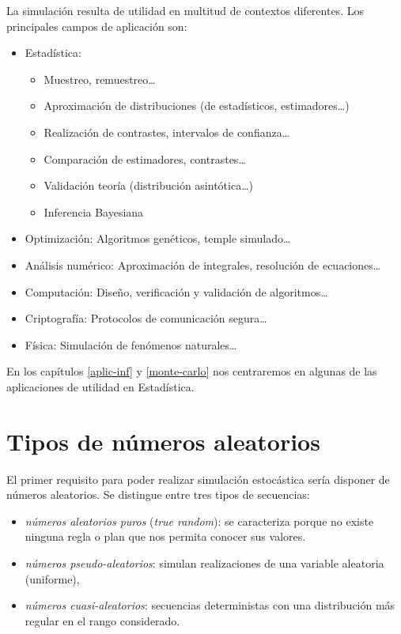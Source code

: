 \documentclass[
]{book}
\theoremstyle{break}
\theoremstyle{nonumberplain}
\begin{document}
La simulación resulta de utilidad en multitud de contextos diferentes.
Los principales campos de aplicación son:

\begin{itemize}
\item
  Estadística:

  \begin{itemize}
  \item
    Muestreo, remuestreo\ldots{}
  \item
    Aproximación de distribuciones (de estadísticos, estimadores\ldots)
  \item
    Realización de contrastes, intervalos de confianza\ldots{}
  \item
    Comparación de estimadores, contrastes\ldots{}
  \item
    Validación teoría (distribución asintótica\ldots)
  \item
    Inferencia Bayesiana
  \end{itemize}
\item
  Optimización: Algoritmos genéticos, temple simulado\ldots{}
\item
  Análisis numérico: Aproximación de integrales, resolución de ecuaciones\ldots{}
\item
  Computación: Diseño, verificación y validación de algoritmos\ldots{}
\item
  Criptografía: Protocolos de comunicación segura\ldots{}
\item
  Física: Simulación de fenómenos naturales\ldots{}
\end{itemize}

En los capítulos \ref{aplic-inf} y \ref{monte-carlo} nos centraremos en algunas de las aplicaciones de utilidad en Estadística.

\hypertarget{tipos-de-nuxfameros-aleatorios}{%
\section{Tipos de números aleatorios}\label{tipos-de-nuxfameros-aleatorios}}

El primer requisito para poder realizar simulación estocástica sería disponer de números aleatorios.
Se distingue entre tres tipos de secuencias:

\begin{itemize}
\item
  \emph{números aleatorios puros} (\emph{true random}): se caracteriza porque no existe ninguna regla o plan que nos permita conocer sus valores.
\item
  \emph{números pseudo-aleatorios}: simulan realizaciones de una variable aleatoria (uniforme),
\item
  \emph{números cuasi-aleatorios}: secuencias deterministas con una distribución más regular en el rango considerado.
\end{itemize}
\end{document}
